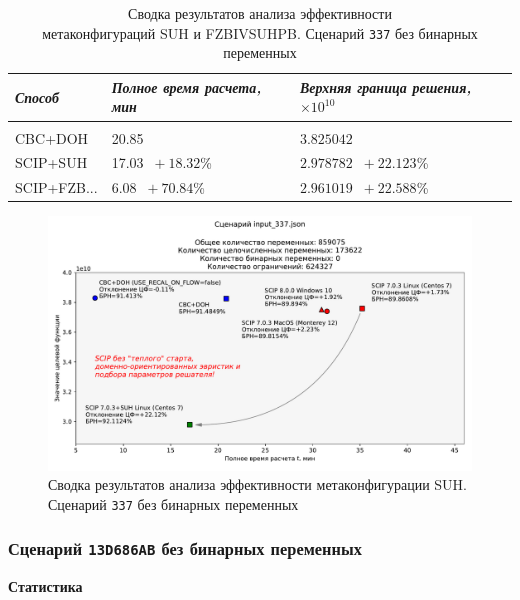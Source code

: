 \documentclass[%
	11pt,
	a4paper,
	utf8,
		]{article}
\begin{document}
{
	\begin{table}[!h]
		\centering
		\caption{Сводка результатов анализа эффективности \\метаконфигураций SUH и FZBIVSUHPB. Сценарий \texttt{337} без бинарных переменных}
		\begin{tabular}{ p{2.5cm} p{3.3cm} p{3.4cm} }
			\emph{Способ} & \emph{Полное время расчета, мин} & \emph{Верхняя граница решения, $ \times 10^{10} $} \\
			\hline\hline\\[-3.5mm]
			{CBC+DOH} & 20.85 & $ 3.825042 $ \\
			\hline
			SCIP+SUH & 17.03 {\color{blue} $\ +18.32 $\%} & $ 2.978782 $ {\color{blue} $\ +22.123 $\%} \\
			\hline
			SCIP+FZB... & 6.08 {\color{blue} $\ +70.84 $\%} & $ 2.961019 $ {\color{blue} $\ +22.588 $\%} \\
		\end{tabular}\label{tab:337_wo_bins}
	\end{table}
}


\begin{figure}[!h]
	\centering
	\includegraphics[scale=0.6]{figures/summary_337.pdf}
	\caption{Сводка результатов анализа эффективности метаконфигурации SUH. \\Сценарий \texttt{337} без бинарных переменных}\label{fig:summary_337}
\end{figure}

\subsubsection{Сценарий \texttt{13D686AB} без бинарных переменных}

\textbf{Статистика}\vspace*{1mm}
\end{document}
